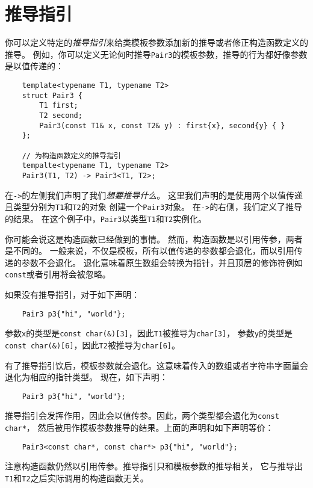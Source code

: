 \section{推导指引}\label{ch9.2}
你可以定义特定的\emph{推导指引}来给类模板参数添加新的推导或者修正构造函数定义的推导。
例如，你可以定义无论何时推导\texttt{Pair3}的模板参数，推导的行为都好像参数是以值传递的：
\begin{lstlisting}
    template<typename T1, typename T2>
    struct Pair3 {
        T1 first;
        T2 second;
        Pair3(const T1& x, const T2& y) : first{x}, second{y} { }
    };

    // 为构造函数定义的推导指引
    tempalte<typename T1, typename T2>
    Pair3(T1, T2) -> Pair3<T1, T2>;
\end{lstlisting}
在\texttt{->}的左侧我们声明了我们\emph{想要推导什么}。
这里我们声明的是使用两个以值传递且类型分别为\texttt{T1}和\texttt{T2}的对象
创建一个\texttt{Pair3}对象。
在\texttt{->}的右侧，我们定义了推导的结果。
在这个例子中，\texttt{Pair3}以类型\texttt{T1}和\texttt{T2}实例化。

你可能会说这是构造函数已经做到的事情。
然而，构造函数是以引用传参，两者是不同的。
一般来说，不仅是模板，所有以值传递的参数都会退化，而以引用传递的参数不会退化。
退化意味着原生数组会转换为指针，并且顶层的修饰符例如\texttt{const}或者引用将会被忽略。

如果没有推导指引，对于如下声明：
\begin{lstlisting}
    Pair3 p3{"hi", "world"};
\end{lstlisting}
参数\texttt{x}的类型是\texttt{const char(\&)[3]}，因此\texttt{T1}被推导为\texttt{char[3]}，
参数\texttt{y}的类型是\texttt{const char(\&)[6]}，因此\texttt{T2}被推导为\texttt{char[6]}。

有了推导指引饮后，模板参数就会退化。这意味着传入的数组或者字符串字面量会退化为相应的指针类型。
现在，如下声明：
\begin{lstlisting}
    Pair3 p3{"hi", "world"};
\end{lstlisting}
推导指引会发挥作用，因此会以值传参。因此，两个类型都会退化为\texttt{const char*}，
然后被用作模板参数推导的结果。上面的声明和如下声明等价：
\begin{lstlisting}
    Pair3<const char*, const char*> p3{"hi", "world"};
\end{lstlisting}
注意构造函数仍然以引用传参。推导指引只和模板参数的推导相关，
它与推导出\texttt{T1}和\texttt{T2}之后实际调用的构造函数无关。

